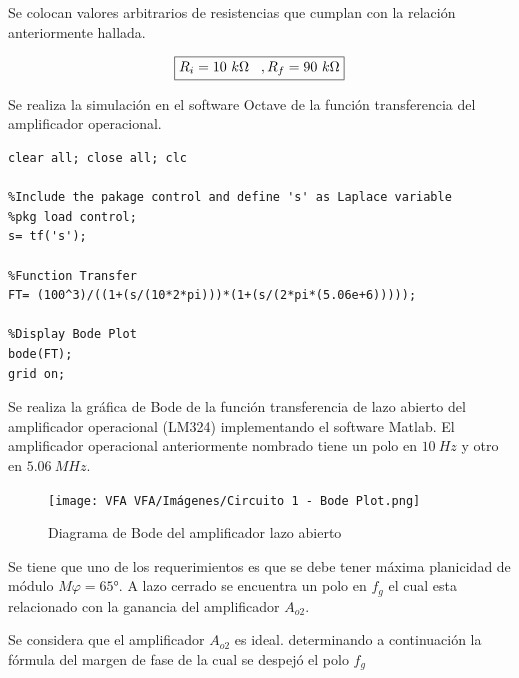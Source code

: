 \bigskip
\hspace{1mm} Se colocan valores arbitrarios de resistencias que cumplan con la relación anteriormente hallada.

\begin{equation}
    \boxed{
        R_i=10~k\Omega \hspace{3mm} , R_f=90~k\Omega
    }
\end{equation}

\bigskip

\hspace{1mm} Se realiza la simulación en el software Octave de la función transferencia del amplificador operacional.

\begin{lstlisting}
clear all; close all; clc

%Include the pakage control and define 's' as Laplace variable
%pkg load control;
s= tf('s');

%Function Transfer
FT= (100^3)/((1+(s/(10*2*pi)))*(1+(s/(2*pi*(5.06e+6)))));

%Display Bode Plot
bode(FT);
grid on; 
\end{lstlisting}
\bigskip

\hspace{1mm}  Se realiza la gráfica de Bode de la función transferencia de lazo abierto del amplificador operacional (LM324) implementando el software Matlab. El amplificador operacional anteriormente nombrado tiene un polo en \(10~Hz\) y otro en \(5.06~MHz\).

\begin{figure}[h!]
  \centering
    \texttt{[image: VFA VFA/Imágenes/Circuito 1 - Bode Plot.png]}
    \caption{Diagrama de Bode del amplificador lazo abierto}
\end{figure}

\bigskip
\hspace{1mm} Se tiene que uno de los requerimientos es que se debe tener máxima planicidad de módulo \(M\varphi =65°\).  A lazo cerrado se encuentra un polo en \(f_g\) el cual esta relacionado con la ganancia del amplificador \(A_{o2}\).
\bigskip

\hspace{1mm} Se considera que el amplificador \(A_{o2}\) es ideal. determinando a continuación la fórmula del margen de fase de la cual se despejó el polo \( 
f_g \)
 
